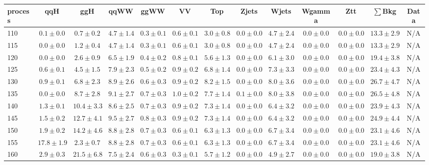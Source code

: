 \begin{table}
{%
 \tiny
 \begin{center}
 \begin{tabular}{l | c c | c c c c c c c c  | c c}
 \hline
 process & qqH & ggH & qqWW & ggWW & VV & Top & Zjets & Wjets & Wgamma & Ztt & $\sum$Bkg & Data \\
 \hline
110 & $0.1\pm0.0$ & $0.7\pm0.2$ & $4.7\pm1.4$ & $0.3\pm0.1$ & $0.6\pm0.1$ & $3.0\pm0.8$ & $0.0\pm0.0$ & $4.7\pm2.4$ & $0.0\pm0.0$ & $0.0\pm0.0$ & $13.3\pm2.9$ & N/A \\
115 & $0.0\pm0.0$ & $1.2\pm0.4$ & $4.7\pm1.4$ & $0.3\pm0.1$ & $0.6\pm0.1$ & $3.0\pm0.8$ & $0.0\pm0.0$ & $4.7\pm2.4$ & $0.0\pm0.0$ & $0.0\pm0.0$ & $13.3\pm2.9$ & N/A \\
120 & $0.0\pm0.0$ & $2.6\pm0.9$ & $6.5\pm1.9$ & $0.4\pm0.2$ & $0.8\pm0.1$ & $5.6\pm1.3$ & $0.0\pm0.0$ & $6.1\pm3.0$ & $0.0\pm0.0$ & $0.0\pm0.0$ & $19.4\pm3.8$ & N/A \\
125 & $0.6\pm0.1$ & $4.5\pm1.5$ & $7.9\pm2.3$ & $0.5\pm0.2$ & $0.9\pm0.2$ & $6.8\pm1.4$ & $0.0\pm0.0$ & $7.3\pm3.3$ & $0.0\pm0.0$ & $0.0\pm0.0$ & $23.4\pm4.3$ & N/A \\
130 & $0.9\pm0.1$ & $6.8\pm2.3$ & $8.9\pm2.6$ & $0.6\pm0.3$ & $0.9\pm0.2$ & $8.2\pm1.5$ & $0.0\pm0.0$ & $8.0\pm3.6$ & $0.0\pm0.0$ & $0.0\pm0.0$ & $26.7\pm4.7$ & N/A \\
135 & $0.0\pm0.0$ & $8.7\pm2.8$ & $9.1\pm2.7$ & $0.7\pm0.3$ & $1.0\pm0.2$ & $7.7\pm1.4$ & $0.1\pm0.0$ & $8.0\pm3.8$ & $0.0\pm0.0$ & $0.0\pm0.0$ & $26.5\pm4.8$ & N/A \\
140 & $1.3\pm0.1$ & $10.4\pm3.3$ & $8.6\pm2.5$ & $0.7\pm0.3$ & $0.9\pm0.2$ & $7.3\pm1.4$ & $0.0\pm0.0$ & $6.4\pm3.2$ & $0.0\pm0.0$ & $0.0\pm0.0$ & $23.9\pm4.3$ & N/A \\
145 & $1.5\pm0.2$ & $12.7\pm4.1$ & $9.5\pm2.7$ & $0.8\pm0.3$ & $0.9\pm0.2$ & $7.3\pm1.4$ & $0.0\pm0.0$ & $6.4\pm3.2$ & $0.0\pm0.0$ & $0.0\pm0.0$ & $24.9\pm4.4$ & N/A \\
150 & $1.9\pm0.2$ & $14.2\pm4.6$ & $8.8\pm2.8$ & $0.7\pm0.3$ & $0.6\pm0.1$ & $6.3\pm1.3$ & $0.0\pm0.0$ & $6.7\pm3.4$ & $0.0\pm0.0$ & $0.0\pm0.0$ & $23.1\pm4.6$ & N/A \\
155 & $17.8\pm1.9$ & $2.3\pm0.7$ & $8.8\pm2.8$ & $0.7\pm0.3$ & $0.6\pm0.1$ & $6.3\pm1.3$ & $0.0\pm0.0$ & $6.7\pm3.4$ & $0.0\pm0.0$ & $0.0\pm0.0$ & $23.1\pm4.6$ & N/A \\
160 & $2.9\pm0.3$ & $21.5\pm6.8$ & $7.5\pm2.4$ & $0.6\pm0.3$ & $0.3\pm0.1$ & $5.7\pm1.2$ & $0.0\pm0.0$ & $4.9\pm2.7$ & $0.0\pm0.0$ & $0.0\pm0.0$ & $19.0\pm3.8$ & N/A \\

\end{tabular}
\end{center}}
\end{table}
